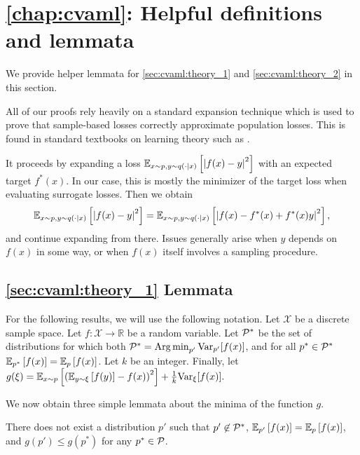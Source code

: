\section{\autoref{chap:cvaml}: Helpful definitions and lemmata}
\label{app:formal:cvaml}

We provide helper lemmata for \autoref{sec:cvaml:theory_1} and \autoref{sec:cvaml:theory_2} in this section.

All of our proofs rely heavily on a standard expansion technique which is used to prove that sample-based losses correctly approximate population losses.
This is found in standard textbooks on learning theory such as \textcite{gyrfi2002adt}. 

It proceeds by expanding a loss $\EEX{x\sim p, y\sim q(\cdot|x)}{\left|f(x) - y\right|^2}$ with an expected target $f^*(x)$.
In our case, this is mostly the minimizer of the target loss when evaluating surrogate losses.
Then we obtain $$\EEX{x\sim p, y\sim q(\cdot|x)}{\left|f(x) - y\right|^2} = \EEX{x\sim p, y\sim q(\cdot|x)}{\left|f(x) - f^*(x) + f^*(x) y\right|^2},$$
and continue expanding from there.
Issues generally arise when $y$ depends on $f(x)$ in some way, or when $f(x)$ itself involves a sampling procedure.

\subsection{\autoref{sec:cvaml:theory_1} Lemmata}

For the following results, we will use the following notation.
Let $\mathcal{X}$ be a discrete sample space. 
Let $f: \mathcal{X} \rightarrow \mathbb{R}$ be a random variable.
Let $\P^*$ be the set of distributions for which both $\P^* = \Argmin_{p'} \mathrm{Var}_{p'}[f(x)]$, and for all $p^* \in \P^*$ $\EEX{p^*}{f(x)} = \EEX{p}{f(x)}$.
Let $k$ be an integer.
Finally, let $g(\xi) = \EEX{x \sim p}{\left(\EEX{y \sim \xi}{f(y)} - f(x)\right)^2} + \frac{1}{k}\mathrm{Var}_\xi[f(x)].$


We now obtain three simple lemmata about the minima of the function $g$.

\begin{lemma}\label{lemma:cvaml:3}
There does not exist a distribution $p'$ such that $p'\not\in \P^*$, $\EEX{p'}{f(x)} = \EEX{p}{f(x)}$, and $g(p') \leq g(p^*)$ for any $p^*\in\P$.
\end{lemma}

